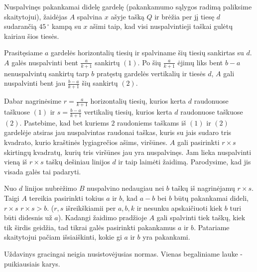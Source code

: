 \begin{enumerate}
Nuspalvinęs pakankamai didelę gardelę (pakankamumo sąlygos radimą
paliksime skaitytojui), žaidėjas $A$ spalvina $x$ ašyje tašką $Q$ ir brėžia per
jį tiesę $d$ sudarančią $45\,^{\circ}$  kampą su $x$ ašimi taip, kad visi
nuspalvintieji taškai gulėtų kairiau šios tiesės.

Prasitęsiame $a$ gardelės horizontalių tiesių ir spalviname šių tiesių
sankirtas su $d$. $A$ galės nuspalvinti bent $ \frac{a}{k+1} $ sankirtų
$(1)$.  Po šių  $ \frac{a}{k+1} $ ėjimų liks bent $b-a$ nenuspalvintų
sankirtų tarp $b$ pratęstų gardelės vertikalių  ir tiesės $d$, $A$ gali
nuspalvinti bent jau $ \frac{b-a}{k+1} $ šių sankirtų $(2)$. 

Dabar nagrinėsime $r= \frac{a}{k+1} $ horizontalių tiesių, kurios kerta
$d$ raudonuose taškuose $(1)$ ir $s= \frac{b-a}{k+1} $ vertikalių tiesių,
kurios kerta $d$ raudonuose taškuose $(2)$. Pastebime, kad bet kuriems $2$
raudoniems taškams iš $(1)$ ir $(2)$ gardelėje atsiras jau nuspalvintas
raudonai taškas, kuris su jais sudaro tris kvadrato, kurio kraštinės
lygiagrečios ašims, viršūnes. $A$ gali pasirinkti  $ r\times s $ skirtingų
kvadratų, kurių tris viršūnes jau yra nuspalvinęs. Jam lieka nuspalvinti
vieną iš  $  r\times s $ taškų dešiniau linijos $d$ ir taip laimėti
žaidimą. Parodysime, kad jis visada galės tai padaryti.

Nuo $d$ linijos nubrėžimo $B$ nuspalvino nedaugiau nei $b$ taškų iš
nagrinėjamų $ r\times s $. Taigi $A$ tereikia pasirinkti tokius $a$ ir
$b$, kad $a-b$ bei $b$ būtų pakankamai dideli, $ r\times s $ $r\times s >
b$. ($r,s$ išreikškiamii per $a,b,k$ ir nesunku apskaičiuoti kiek $b$ turi
būti didesnis už $a$). Kadangi žaidimo pradžioje $A$ gali spalvinti tiek
taškų, kiek tik širdis geidžia, tad tikrai galės pasirinkti pakankamus $a$
ir $b$. Patariame skaitytojui pačiam išsiaiškinti, kokie gi $a$ ir $b$ yra
pakankami.

Uždavinys gracingai neigia nusistovėjusias normas. Vienas begaliniame
lauke - puikiausiais karys.
\end{enumerate}
